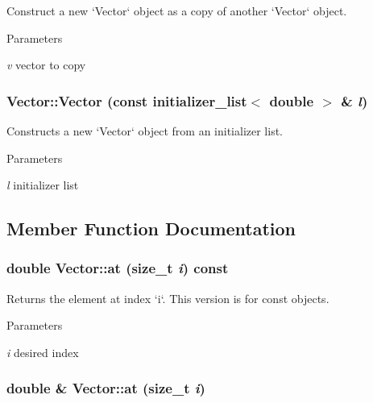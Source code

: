 Construct a new `Vector` object as a copy of another `Vector` object. 
\begin{DoxyParams}{Parameters}
\item[{\em v}]vector to copy \end{DoxyParams}
\hypertarget{classcs1730_1_1Vector_aa75cb45805c288512a0d67fef2fb210b}{
\subsubsection[{Vector}]{\setlength{\rightskip}{0pt plus 5cm}Vector::Vector (const initializer\_\-list$<$ double $>$ \& {\em l})}}
\label{classcs1730_1_1Vector_aa75cb45805c288512a0d67fef2fb210b}


Constructs a new `Vector` object from an initializer list. 
\begin{DoxyParams}{Parameters}
\item[{\em l}]initializer list \end{DoxyParams}


\subsection{Member Function Documentation}
\hypertarget{classcs1730_1_1Vector_a1191a55feadaff0f2e31e504182790c0}{
\subsubsection[{at}]{\setlength{\rightskip}{0pt plus 5cm}double Vector::at (size\_\-t {\em i}) const}}
\label{classcs1730_1_1Vector_a1191a55feadaff0f2e31e504182790c0}


Returns the element at index `i`. This version is for const objects. 
\begin{DoxyParams}{Parameters}
\item[{\em i}]desired index \end{DoxyParams}
\hypertarget{classcs1730_1_1Vector_ac6a29c2fc7cf67d333483ba396b96323}{
\subsubsection[{at}]{\setlength{\rightskip}{0pt plus 5cm}double \& Vector::at (size\_\-t {\em i})}}
\label{classcs1730_1_1Vector_ac6a29c2fc7cf67d333483ba396b96323}


